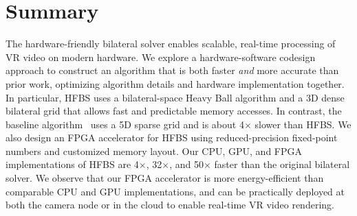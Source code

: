 \section{Summary}

The hardware-friendly bilateral solver enables scalable, real-time processing of VR video on modern hardware.
We explore a hardware-software codesign approach to construct an algorithm that is both faster \emph{and} more accurate than prior work, optimizing algorithm details and hardware implementation together.
In particular, HFBS uses a bilateral-space Heavy Ball algorithm and a 3D dense bilateral grid that allows fast and predictable memory accesses.
In contrast, the baseline algorithm~\cite{BarronPoole2016} uses a 5D sparse grid and is about 4$\times$ slower than HFBS.
We also design an FPGA accelerator for HFBS using reduced-precision fixed-point numbers and customized memory layout.
Our CPU, GPU, and FPGA implementations of HFBS are 4$\times$, 32$\times$, and 50$\times$ faster than the original bilateral solver.
We observe that our FPGA accelerator is more energy-efficient than comparable CPU and GPU implementations, and can be practically deployed at both the camera node or in the cloud to enable real-time VR video rendering.
